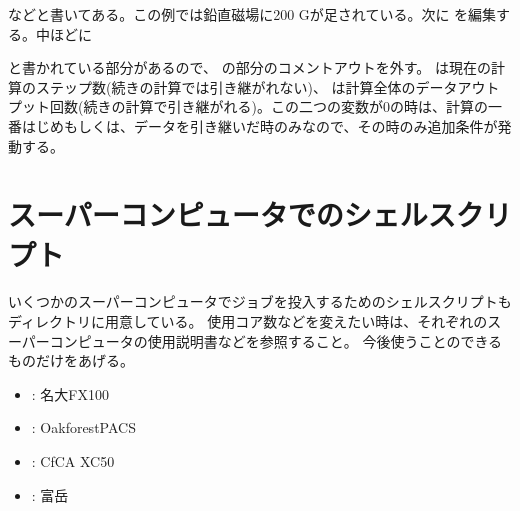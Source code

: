 \documentclass[letterpaper,10pt,dvipdfmx,report]{sphinxmanual}
\begin{document}
\sphinxAtStartPar
などと書いてある。この例では鉛直磁場に200 Gが足されている。次に  を編集する。中ほどに

\begin{sphinxVerbatim}[commandchars=\\\{\}]
\end{sphinxVerbatim}

\sphinxAtStartPar
と書かれている部分があるので、  の部分のコメントアウトを外す。  は現在の計算のステップ数(続きの計算では引き継がれない)、  は計算全体のデータアウトプット回数(続きの計算で引き継がれる)。この二つの変数が0の時は、計算の一番はじめもしくは、データを引き継いだ時のみなので、その時のみ追加条件が発動する。


\section{スーパーコンピュータでのシェルスクリプト}
\label{\detokenize{start:id5}}
\sphinxAtStartPar
いくつかのスーパーコンピュータでジョブを投入するためのシェルスクリプトも  ディレクトリに用意している。
使用コア数などを変えたい時は、それぞれのスーパーコンピュータの使用説明書などを参照すること。
今後使うことのできるものだけをあげる。
\begin{itemize}
\item {} 
\sphinxAtStartPar
{} : 名大FX100

\item {} 
\sphinxAtStartPar
{} : Oakforest\sphinxhyphen{}PACS

\item {} 
\sphinxAtStartPar
{} : CfCA XC50

\item {} 
\sphinxAtStartPar
{} : 富岳

\end{itemize}
\end{document}
